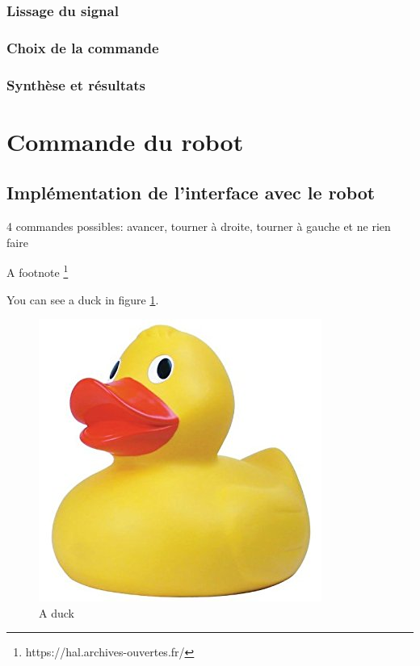 \documentclass[11pt]{article}
\begin{document}
\subsubsection{Lissage du signal}
\subsubsection{Choix de la commande}
\subsubsection{Synthèse et résultats}

\cleardoublepage


\section{Commande du robot}

 	  
\subsection{Implémentation de l'interface avec le robot}
4 commandes possibles: avancer, tourner à droite, tourner à gauche et ne rien faire

A footnote \footnote{https://hal.archives-ouvertes.fr/}

You can see a duck in figure \ref{fig:duck}.

\begin{figure}[!h]
\centering
\includegraphics[scale=0.3]{bidon.jpg}
\caption{A duck}
\label{fig:duck}
\end{figure}
\end{document}
